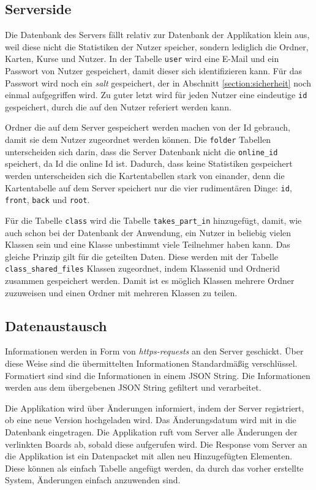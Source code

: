 \subsection{Serverside}
Die Datenbank des Servers fällt relativ zur Datenbank der Applikation klein aus, weil diese nicht die Statistiken der Nutzer speicher, sondern lediglich die Ordner, Karten, Kurse und Nutzer. In der Tabelle \texttt{user} wird eine E-Mail und ein Passwort von Nutzer gespeichert, damit dieser sich identifizieren kann. Für das Passwort wird noch ein \textit{salt} gespeichert, der in Abschnitt \ref{section:sicherheit} noch einmal aufgegriffen wird. Zu guter letzt wird für jeden Nutzer eine eindeutige \texttt{id} gespeichert, durch die auf den Nutzer referiert werden kann.

Ordner die auf dem Server gespeichert werden machen von der Id gebrauch, damit sie dem Nutzer zugeordnet werden können. Die \texttt{folder} Tabellen unterscheiden sich darin, dass die Server Datenbank nicht die \texttt{online\_id} speichert, da Id die online Id ist. Dadurch, dass keine Statistiken gespeichert werden unterscheiden sich die Kartentabellen stark von einander, denn die Kartentabelle auf dem Server speichert nur die vier rudimentären Dinge: \texttt{id}, \texttt{front}, \texttt{back} und \texttt{root}.

Für die Tabelle \texttt{class} wird die Tabelle \texttt{takes\_part\_in} hinzugefügt, damit, wie auch schon bei der Datenbank der Anwendung, ein Nutzer in beliebig vielen Klassen sein und eine Klasse unbestimmt viele Teilnehmer haben kann. Das gleiche Prinzip gilt für die geteilten Daten. Diese werden mit der Tabelle \texttt{class\_shared\_files} Klassen zugeordnet, indem Klassenid und Ordnerid zusammen gespeichert werden. Damit ist es möglich Klassen mehrere Ordner zuzuweisen und einen Ordner mit mehreren Klassen zu teilen.

\subsection{Datenaustausch}

Informationen werden in Form von \textit{https-requests} an den Server geschickt. Über diese Weise sind die übermittelten Informationen Standardmäßig verschlüssel. Formatiert sind sind die Informationen in einem JSON String. Die Informationen werden aus dem übergebenen JSON String gefiltert und verarbeitet.

Die Applikation wird über Änderungen informiert, indem der Server registriert, ob eine neue Version hochgeladen wird. Das Änderungsdatum wird mit in die Datenbank eingetragen. Die Applikation ruft vom Server alle Änderungen der verlinkten Boards ab, sobald diese aufgerufen wird. Die Response vom Server an die Applikation ist ein Datenpacket mit allen neu Hinzugefügten Elementen. Diese können als einfach Tabelle angefügt werden, da durch das vorher erstellte System, Änderungen einfach anzuwenden sind.

